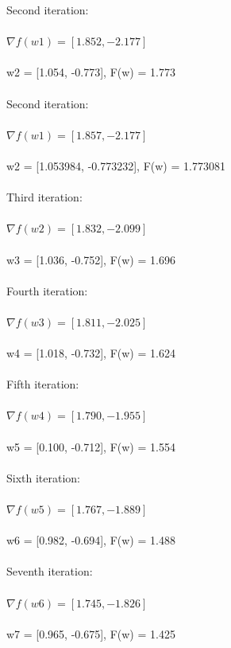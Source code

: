 \documentclass{article}
\begin{document}
\noindent Second iteration: \\ \\
$\nabla f(w1)= [1.852,-2.177]$ \\ \\
w2 = [1.054, -0.773], F(w) = 1.773 \\ \\

\noindent Second iteration: \\ \\
$\nabla f(w1)= [1.857,-2.177]$ \\ \\
w2 = [1.053984, -0.773232], F(w) = 1.773081 \\ \\

\noindent Third iteration: \\ \\
$\nabla f(w2)= [1.832,-2.099]$ \\ \\
w3 = [1.036, -0.752], F(w) = 1.696 \\ \\

\noindent Fourth iteration: \\ \\
$\nabla f(w3)= [1.811,-2.025]$ \\ \\
w4 = [1.018, -0.732], F(w) = 1.624 \\ \\

\noindent Fifth iteration: \\ \\
$\nabla f(w4)= [1.790,-1.955]$ \\ \\
w5 = [0.100, -0.712], F(w) = 1.554 \\ \\

\noindent Sixth iteration: \\ \\
$\nabla f(w5)= [1.767,-1.889]$ \\ \\
w6 = [0.982, -0.694], F(w) = 1.488 \\ \\

\noindent Seventh iteration: \\ \\
$\nabla f(w6)= [1.745,-1.826]$ \\ \\
w7 = [0.965, -0.675], F(w) = 1.425 \\ \\
\end{document}
